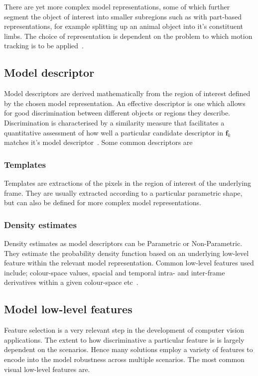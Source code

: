 There are yet more complex model representations, some of which further segment
the object of interest into smaller subregions such as with part-based
representations, for example splitting up an animal object into it's constituent
limbs. The choice of representation is dependent on the problem to which motion
tracking is to be applied~\cite{Porikli2012}.

\subsection{Model descriptor}\label{literature_review_descriptors}
Model descriptors are derived mathematically from the region of interest defined
by the chosen model representation. An effective descriptor is one which allows
for good discrimination between different objects or regions they
describe. Discrimination is characterised by a similarity measure that
facilitates a quantitative assessment of how well a particular candidate
descriptor in $\mathbf{f}_{k}$ matches it's model descriptor~\cite{Shantaiya2013}.
Some common descriptors are

\subsubsection{Templates}\label{literature_review_template}
Templates are extractions of the pixels in the region of interest of the
underlying frame. They are usually extracted according to a particular
parametric shape, but can also be defined for more complex model representations.

\subsubsection{Density estimates}
Density estimates as model descriptors can be Parametric or Non-Parametric. They
estimate the probability density function based on an underlying low-level
feature within the relevant model representation.
Common low-level features used include; colour-space values, spacial and
temporal intra- and inter-frame derivatives within a given colour-space
etc~\cite{Shantaiya2013}.

\subsection{Model low-level features}
Feature selection is a very relevant step in the development of computer vision
applications. The extent to how discriminative a particular feature is is
largely dependent on the scenarios. Hence many solutions employ a
variety of features to encode into the model robustness across multiple
scenarios. The most common visual low-level features are.

